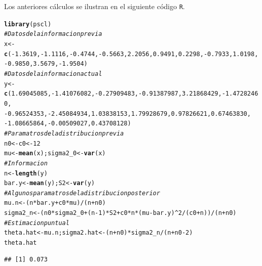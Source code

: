 \documentclass[10pt,openright]{book}\usepackage[]{graphicx}\usepackage[]{color}
\makeatletter
\newcommand{\hlnum}[1]{\textcolor[rgb]{0.686,0.059,0.569}{#1}}%
\newcommand{\hlcom}[1]{\textcolor[rgb]{0.678,0.584,0.686}{\textit{#1}}}%
\newcommand{\hlopt}[1]{\textcolor[rgb]{0,0,0}{#1}}%
\newcommand{\hlstd}[1]{\textcolor[rgb]{0.345,0.345,0.345}{#1}}%
\newcommand{\hlkwb}[1]{\textcolor[rgb]{0.69,0.353,0.396}{#1}}%
\newcommand{\hlkwd}[1]{\textcolor[rgb]{0.737,0.353,0.396}{\textbf{#1}}}%
\newenvironment{kframe}{%
 \def\at@end@of@kframe{}%
 \ifinner\ifhmode%
  \def\at@end@of@kframe{\end{minipage}}%
  \begin{minipage}{\columnwidth}%
 \fi\fi%
 \def\FrameCommand##1{\hskip\@totalleftmargin \hskip-\fboxsep
 \colorbox{shadecolor}{##1}\hskip-\fboxsep
     \hskip-\linewidth \hskip-\@totalleftmargin \hskip\columnwidth}%
 \MakeFramed {\advance\hsize-\width
   \@totalleftmargin\z@ \linewidth\hsize
   \@setminipage}}%
 {\par\unskip\endMakeFramed%
 \at@end@of@kframe}
\newenvironment{knitrout}{}{} %
\makeatother
\begin{document}
\begin{Eje}
Los anteriores c\'alculos se ilustran en el siguiente c\'odigo \verb'R'.
\begin{knitrout}
\color{fgcolor}\begin{kframe}
\begin{alltt}
\hlkwd{library}\hlstd{(pscl)}
\hlcom{# Datos de la informacion previa}
\hlstd{x} \hlkwb{<-} \hlkwd{c}\hlstd{(}\hlopt{-}\hlnum{1.3619}\hlstd{,} \hlopt{-}\hlnum{1.1116}\hlstd{,} \hlopt{-}\hlnum{0.4744}\hlstd{,} \hlopt{-}\hlnum{0.5663}\hlstd{,} \hlnum{2.2056}\hlstd{,} \hlnum{0.9491}\hlstd{,} \hlnum{0.2298}\hlstd{,} \hlopt{-}\hlnum{0.7933}\hlstd{,} \hlnum{1.0198}\hlstd{,}
          \hlopt{-}\hlnum{0.9850}\hlstd{,} \hlnum{3.5679}\hlstd{,} \hlopt{-}\hlnum{1.9504}\hlstd{)}
\hlcom{# Datos de la informacion actual}
\hlstd{y} \hlkwb{<-} \hlkwd{c}\hlstd{(}\hlnum{1.69045085}\hlstd{,} \hlopt{-}\hlnum{1.41076082}\hlstd{,} \hlopt{-}\hlnum{0.27909483}\hlstd{,} \hlopt{-}\hlnum{0.91387987}\hlstd{,} \hlnum{3.21868429}\hlstd{,} \hlopt{-}\hlnum{1.47282460}\hlstd{,}
          \hlopt{-}\hlnum{0.96524353}\hlstd{,} \hlopt{-}\hlnum{2.45084934}\hlstd{,} \hlnum{1.03838153}\hlstd{,} \hlnum{1.79928679}\hlstd{,} \hlnum{0.97826621}\hlstd{,} \hlnum{0.67463830}\hlstd{,}
          \hlopt{-}\hlnum{1.08665864}\hlstd{,} \hlopt{-}\hlnum{0.00509027}\hlstd{,} \hlnum{0.43708128}\hlstd{)}
\hlcom{# Paramatros de la distribucion previa}
\hlstd{n0} \hlkwb{<-} \hlstd{c0} \hlkwb{<-} \hlnum{12}
\hlstd{mu} \hlkwb{<-} \hlkwd{mean}\hlstd{(x); sigma2_0} \hlkwb{<-} \hlkwd{var}\hlstd{(x)}
\hlcom{# Informacion}
\hlstd{n} \hlkwb{<-} \hlkwd{length}\hlstd{(y)}
\hlstd{bar.y} \hlkwb{<-} \hlkwd{mean}\hlstd{(y); S2} \hlkwb{<-} \hlkwd{var}\hlstd{(y)}
\hlcom{# Algunos paramatros de la distribucion posterior}
\hlstd{mu.n} \hlkwb{<-} \hlstd{(n}\hlopt{*}\hlstd{bar.y} \hlopt{+} \hlstd{c0}\hlopt{*}\hlstd{mu)}\hlopt{/}\hlstd{(n}\hlopt{+}\hlstd{n0)}
\hlstd{sigma2_n} \hlkwb{<-} \hlstd{(n0}\hlopt{*}\hlstd{sigma2_0}\hlopt{+}\hlstd{(n}\hlopt{-}\hlnum{1}\hlstd{)}\hlopt{*}\hlstd{S2}\hlopt{+}\hlstd{c0}\hlopt{*}\hlstd{n}\hlopt{*}\hlstd{(mu}\hlopt{-}\hlstd{bar.y)}\hlopt{^}\hlnum{2}\hlopt{/}\hlstd{(c0}\hlopt{+}\hlstd{n))}\hlopt{/}\hlstd{(n}\hlopt{+}\hlstd{n0)}
\hlcom{# Estimacion puntual}
\hlstd{theta.hat} \hlkwb{<-} \hlstd{mu.n; sigma2.hat} \hlkwb{<-} \hlstd{(n}\hlopt{+}\hlstd{n0)}\hlopt{*}\hlstd{sigma2_n}\hlopt{/}\hlstd{(n}\hlopt{+}\hlstd{n0}\hlopt{-}\hlnum{2}\hlstd{)}
\hlstd{theta.hat}
\end{alltt}
\begin{verbatim}
## [1] 0.073
\end{verbatim}

\end{kframe}
\end{knitrout}
\end{Eje}
\end{document}
